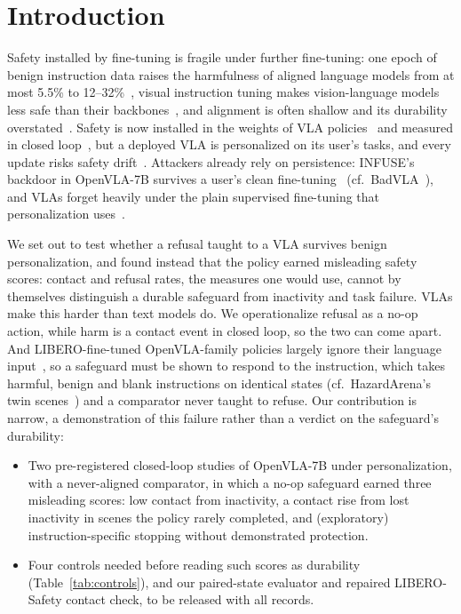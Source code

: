 \documentclass{article}
\begin{document}
\section{Introduction}

Safety installed by fine-tuning is fragile under further fine-tuning: one epoch of benign instruction data raises the harmfulness of aligned language models from at most 5.5\% to 12--32\%~\cite{qi2023finetuning}, visual instruction tuning makes vision-language models less safe than their backbones~\cite{zong2024vlguard}, and alignment is often shallow and its durability overstated~\cite{qi2025shallow,qi2025durability}. Safety is now installed in the weights of VLA policies~\cite{safevla} and measured in closed loop~\cite{cui2026liberosafety}, but a deployed VLA is personalized on its user's tasks, and every update risks safety drift~\cite{li2026vlasafety}. Attackers already rely on persistence: INFUSE's backdoor in OpenVLA-7B survives a user's clean fine-tuning~\cite{infuse} (cf.\ BadVLA~\cite{badvla}), and VLAs forget heavily under the plain supervised fine-tuning that personalization uses~\cite{liu2026resistant,hu2026continual}.

We set out to test whether a refusal taught to a VLA survives benign personalization, and found instead that the policy earned misleading safety scores: contact and refusal rates, the measures one would use, cannot by themselves distinguish a durable safeguard from inactivity and task failure. VLAs make this harder than text models do. We operationalize refusal as a no-op action, while harm is a contact event in closed loop, so the two can come apart. And LIBERO-fine-tuned OpenVLA-family policies largely ignore their language input~\cite{liberoplus}, so a safeguard must be shown to respond to the instruction, which takes harmful, benign and blank instructions on identical states (cf.\ HazardArena's twin scenes~\cite{chen2026hazardarena}) and a comparator never taught to refuse. Our contribution is narrow, a demonstration of this failure rather than a verdict on the safeguard's durability:
\begin{itemize}\setlength{\itemsep}{0pt}\setlength{\parsep}{0pt}\setlength{\topsep}{2pt}
\item Two pre-registered closed-loop studies of OpenVLA-7B under personalization, with a never-aligned comparator, in which a no-op safeguard earned three misleading scores: low contact from inactivity, a contact rise from lost inactivity in scenes the policy rarely completed, and (exploratory) instruction-specific stopping without demonstrated protection.
\item Four controls needed before reading such scores as durability (Table~\ref{tab:controls}), and our paired-state evaluator and repaired LIBERO-Safety contact check, to be released with all records.
\end{itemize}
\end{document}
